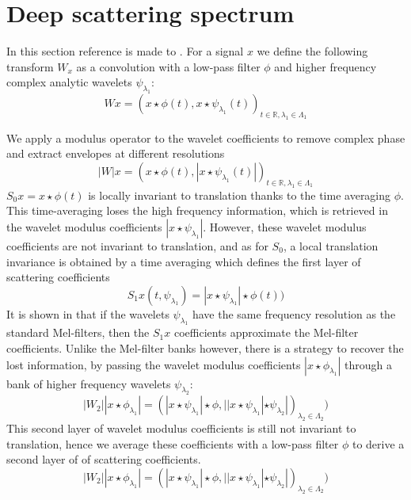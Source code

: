 \section{Deep scattering spectrum}
In this section reference is made to \citep{anden2011multiscale, anden2014deep, zeghidour2016deep}. For a signal $x$ we define the following transform $W_x$ as a convolution with a low-pass filter $\phi$ and higher frequency complex analytic wavelets $\psi_{\lambda_1}$:
\begin{equation}
Wx=(x\star\phi(t),x\star\psi_{\lambda_1}(t))_{t\in\mathbb{R},\lambda_1\in\Lambda_1} \label{eqn_c4_dss01}
\end{equation}

We apply a modulus operator to the wavelet coefficients to remove complex phase and extract envelopes at different resolutions
\begin{equation}
|W|x=\left(x\star\phi(t),|x\star\psi_{\lambda_1}(t)|\right)_{t\in\mathbb{R},\lambda_1\in\Lambda_1} \label{eqn_c4_dss02}
\end{equation}
$S_0x=x\star\phi(t)$ is locally invariant to translation thanks to the time averaging $\phi$.  This time-averaging loses the high frequency information, which is retrieved in the wavelet modulus coefficients $|x\star\psi_{\lambda_1}|$.  However, these wavelet modulus coefficients are not invariant to translation, and as for $S_0$, a local translation invariance is obtained by a time averaging which defines the first layer of scattering coefficients
\begin{equation}
S_1x(t,\psi_{\lambda_1})=|x \star\psi_{\lambda_1}| \star\phi(t)\label{eqn_c4_dss03})
\end{equation}
It is shown in \cite{anden2014deep} that if the wavelets $\psi_{\lambda_1}$ have the same frequency resolution as the standard Mel-filters, then the $S_1x$ coefficients approximate the Mel-filter coefficients.  Unlike the Mel-filter banks however, there is a strategy to recover the lost information, by passing the wavelet modulus coefficients  $|x\star\phi_{\lambda_1}|$ through a bank of higher frequency wavelets $\psi_{\lambda_2}$:
\begin{equation}
|W_2||x\star\phi_{\lambda_1}|=\left(|x\star\psi_{\lambda_1}|\star\phi,||x\star\psi_{\lambda_1}|\star\psi_{\lambda_2}|\right)_{\lambda_2\in\Lambda_2} \label{eqn_c4_dss04})\end{equation}
This second layer of wavelet modulus coefficients is still not invariant to translation, hence we average these coefficients with a low-pass filter $\phi$ to derive a second layer of of scattering coefficients.
 \begin{equation}
|W_2||x\star\phi_{\lambda_1}|=\left(|x\star\psi_{\lambda_1}|\star\phi,||x\star\psi_{\lambda_1}|\star\psi_{\lambda_2}|\right)_{\lambda_2\in\Lambda_2}\label{eqn_c4_dss04})\end{equation}

